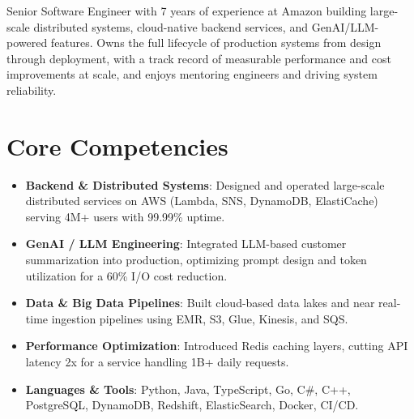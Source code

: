 \documentclass[11pt,a4paper,sans]{moderncv}
\begin{document}
\makecvtitle


\vspace{6pt}
\small{Senior Software Engineer with 7 years of experience at Amazon building large-scale distributed systems, cloud-native backend services, and GenAI/LLM-powered features. Owns the full lifecycle of production systems from design through deployment, with a track record of measurable performance and cost improvements at scale, and enjoys mentoring engineers and driving system reliability.}


\section{Core Competencies}
\vspace{1pt}
\begin{itemize}

\item \textbf{Backend \& Distributed Systems}: Designed and operated large-scale distributed services on AWS (Lambda, SNS, DynamoDB, ElastiCache) serving 4M+ users with 99.99\% uptime.

\item \textbf{GenAI / LLM Engineering}: Integrated LLM-based customer summarization into production, optimizing prompt design and token utilization for a 60\% I/O cost reduction.

\item \textbf{Data \& Big Data Pipelines}: Built cloud-based data lakes and near real-time ingestion pipelines using EMR, S3, Glue, Kinesis, and SQS.

\item \textbf{Performance Optimization}: Introduced Redis caching layers, cutting API latency 2x for a service handling 1B+ daily requests.

\item \textbf{Languages \& Tools}: Python, Java, TypeScript, Go, C\#, C++, PostgreSQL, DynamoDB, Redshift, ElasticSearch, Docker, CI/CD.

\end{itemize}

\end{document}
